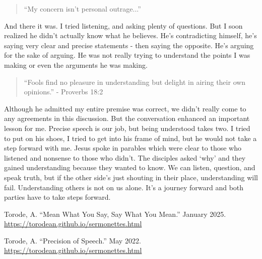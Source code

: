 \documentclass[10pt]{article}
\begin{document}
\begin{multicols}{2}
\begin{quotation}
``My concern isn’t personal outrage...''
\end{quotation}

And there it was. I tried listening, and asking plenty of questions. But I soon realized he didn't actually know what he believes. He's contradicting himself, he's saying very clear and precise statements - then saying the opposite. He's arguing for the sake of arguing. He was not really trying to understand the points I was making or even the arguments he was making.

\begin{quotation}
``Fools find no pleasure in understanding but delight in airing their own opinions.'' - Proverbs 18:2
\end{quotation}

Although he admitted my entire premise was correct, we didn't really come to any agreements in this discussion. But the conversation enhanced an important lesson for me. Precise speech is our job, but being understood takes two. I tried to put on his shoes, I tried to get into his frame of mind, but he would not take a step forward with me. Jesus spoke in parables which were clear to those who listened and nonsense to those who didn't. The disciples asked `why' and they gained understanding because they wanted to know. We can listen, question, and speak truth, but if the other side's just shouting in their place, understanding will fail. Understanding others is not on us alone. It's a journey forward and both parties have to take steps forward.




\begin{thebibliography}{9}
	{\footnotesize
	 Torode, A. ``Mean What You Say, Say What You Mean.'' January 2025. \url{https://torodean.github.io/sermonettes.html}
	
	 Torode, A. ``Precision of Speech.'' May 2022. \url{https://torodean.github.io/sermonettes.html}

	}
\end{thebibliography}

\end{multicols}


\end{document}
